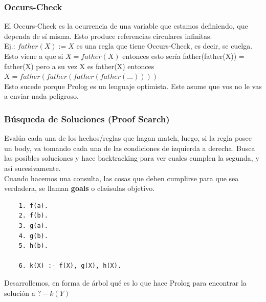 \documentclass[10pt,a4paper]{article}
\begin{document}
\subsubsection*{Occurs-Check}
El Occurs-Check es la ocurrencia de una variable que estamos definiendo, que dependa de sí misma. Esto produce referencias circulares infinitas. \\
Ej.: $father(X) := X$ es una regla que tiene Occurs-Check, es decir, se cuelga. Esto viene a que si $X = father(X)$ entonces esto sería father(father(X)) = father(X) pero a su vez X es father(X) entonces $X = father(father(father(father(\dots))))$ \\
Esto sucede porque Prolog es un lenguaje optimista. Este asume que vos no le vas a enviar nada peligroso.
\subsubsection*{Búsqueda de Soluciones (Proof Search)}
Evalúa cada una de los hechos/reglas que hagan match, luego, si la regla posee un body, va tomando cada una de las condiciones de izquierda a derecha. Busca las posibles soluciones y hace backtracking para ver cuales cumplen la segunda, y así sucesivamente. \\
Cuando hacemos una consulta, las cosas que deben cumplirse para que sea verdadera, se llaman \textbf{goals} o claúsulas objetivo.
\begin{lstlisting}
    1. f(a).
    2. f(b).
    3. g(a).
    4. g(b).
    5. h(b).

    6. k(X) :- f(X), g(X), h(X).
\end{lstlisting}
Desarrollemos, en forma de árbol qué es lo que hace Prolog para encontrar la solución a $?- k(Y)$
\end{document}
